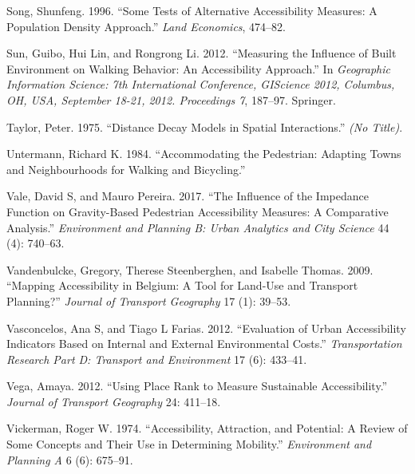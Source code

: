 \documentclass[preprint, 3p,
authoryear]{elsarticle} %
\newlength{\cslhangindent}
\newlength{\cslentryspacingunit} %
\newenvironment{CSLReferences}[2] %
 {%
  \setlength{\parindent}{0pt}
  \ifodd #1
  \let\oldpar\par
  \def\par{\hangindent=\cslhangindent\oldpar}
  \fi
  \setlength{\parskip}{#2\cslentryspacingunit}
 }%
 {}
\begin{document}
\begin{CSLReferences}{1}{0}
\leavevmode{}%
Song, Shunfeng. 1996. {``Some Tests of Alternative Accessibility
Measures: A Population Density Approach.''} \emph{Land Economics},
474--82.

\leavevmode{}%
Sun, Guibo, Hui Lin, and Rongrong Li. 2012. {``Measuring the Influence
of Built Environment on Walking Behavior: An Accessibility Approach.''}
In \emph{Geographic Information Science: 7th International Conference,
GIScience 2012, Columbus, OH, USA, September 18-21, 2012. Proceedings
7}, 187--97. Springer.

\leavevmode{}%
Taylor, Peter. 1975. {``Distance Decay Models in Spatial
Interactions.''} \emph{(No Title)}.

\leavevmode{}%
Untermann, Richard K. 1984. {``Accommodating the Pedestrian: Adapting
Towns and Neighbourhoods for Walking and Bicycling.''}

\leavevmode{}%
Vale, David S, and Mauro Pereira. 2017. {``The Influence of the
Impedance Function on Gravity-Based Pedestrian Accessibility Measures: A
Comparative Analysis.''} \emph{Environment and Planning B: Urban
Analytics and City Science} 44 (4): 740--63.

\leavevmode{}%
Vandenbulcke, Gregory, Therese Steenberghen, and Isabelle Thomas. 2009.
{``Mapping Accessibility in Belgium: A Tool for Land-Use and Transport
Planning?''} \emph{Journal of Transport Geography} 17 (1): 39--53.

\leavevmode{}%
Vasconcelos, Ana S, and Tiago L Farias. 2012. {``Evaluation of Urban
Accessibility Indicators Based on Internal and External Environmental
Costs.''} \emph{Transportation Research Part D: Transport and
Environment} 17 (6): 433--41.

\leavevmode{}%
Vega, Amaya. 2012. {``Using Place Rank to Measure Sustainable
Accessibility.''} \emph{Journal of Transport Geography} 24: 411--18.

\leavevmode{}%
Vickerman, Roger W. 1974. {``Accessibility, Attraction, and Potential: A
Review of Some Concepts and Their Use in Determining Mobility.''}
\emph{Environment and Planning A} 6 (6): 675--91.


\end{CSLReferences}
\end{document}
